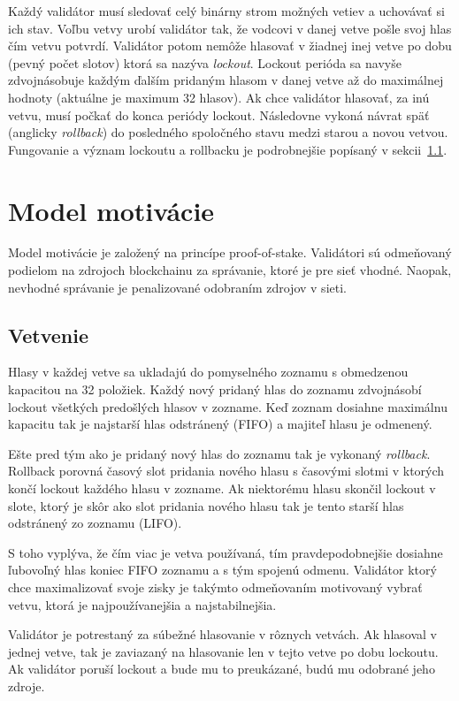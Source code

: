 Každý validátor musí sledovať celý binárny strom možných vetiev a uchovávať si ich stav. Voľbu vetvy urobí validátor tak, že vodcovi v danej vetve pošle svoj hlas čím vetvu potvrdí. Validátor potom nemôže hlasovať v žiadnej inej vetve po dobu (pevný počet slotov) ktorá sa nazýva \textit{lockout}. Lockout perióda sa navyše zdvojnásobuje každým ďalším pridaným hlasom v danej vetve až do maximálnej hodnoty (aktuálne je maximum 32 hlasov). Ak chce validátor hlasovať, za inú vetvu, musí počkať do konca periódy lockout. Následovne vykoná návrat späť (anglicky \textit{rollback}) do posledného spoločného stavu medzi starou a novou vetvou. Fungovanie a význam lockoutu a rollbacku je podrobnejšie popísaný v sekcii~\ref{subsec:solana-branch}.

\section{Model motivácie}\label{sec:solana-motiv}
Model motivácie je založený na princípe proof-of-stake. Validátori sú odmeňovaný podielom na zdrojoch blockchainu za správanie, ktoré je pre sieť vhodné. Naopak, nevhodné správanie je penalizované odobraním zdrojov v sieti.

\subsection{Vetvenie}\label{subsec:solana-branch}
Hlasy v každej vetve sa ukladajú do pomyselného zoznamu s obmedzenou kapacitou na 32 položiek. Každý nový pridaný hlas do zoznamu zdvojnásobí lockout všetkých predošlých hlasov v zozname. Keď zoznam dosiahne maximálnu kapacitu tak je najstarší hlas odstránený (FIFO) a majiteľ hlasu je odmenený.

Ešte pred tým ako je pridaný nový hlas do zoznamu tak je vykonaný \textit{rollback}. Rollback porovná časový slot pridania nového hlasu s časovými slotmi v ktorých končí lockout každého hlasu v zozname. Ak niektorému hlasu skončil lockout v slote, ktorý je skôr ako slot pridania nového hlasu tak je tento starší hlas odstránený zo zoznamu (LIFO).

S toho vyplýva, že čím viac je vetva používaná, tím pravdepodobnejšie dosiahne ľubovoľný hlas koniec FIFO zoznamu a s tým spojenú odmenu. Validátor ktorý chce maximalizovať svoje zisky je takýmto odmeňovaním motivovaný vybrať vetvu, ktorá je najpoužívanejšia a najstabilnejšia.

Validátor je potrestaný za súbežné hlasovanie v rôznych vetvách. Ak hlasoval v jednej vetve, tak je zaviazaný na hlasovanie len v tejto vetve po dobu lockoutu. Ak validátor poruší lockout a bude mu to preukázané, budú mu odobrané jeho zdroje.

